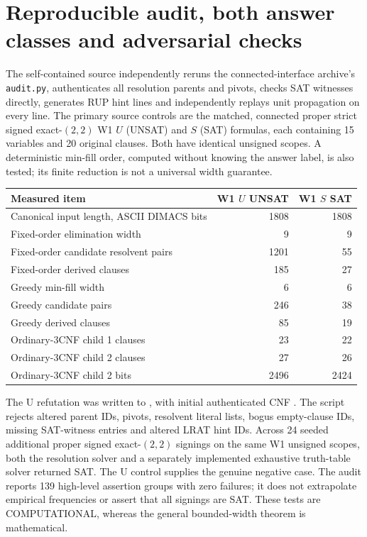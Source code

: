 \documentclass[11pt]{article}
\begin{document}
\section{Reproducible audit, both answer classes and adversarial checks}
The self-contained source  independently reruns the connected-interface archive's \texttt{audit.py}, authenticates all resolution parents and pivots, checks SAT witnesses directly, generates RUP hint lines and independently replays unit propagation on every line. The primary source controls are the matched, connected proper strict signed exact-$(2,2)$ W1 $U$ (UNSAT) and $S$ (SAT) formulas, each containing 15 variables and 20 original clauses. Both have identical unsigned scopes. A deterministic min-fill order, computed without knowing the answer label, is also tested; its finite reduction is not a universal width guarantee.

\begin{center}\begin{tabular}{lrr}\toprule
Measured item & W1 $U$ UNSAT & W1 $S$ SAT\\\midrule
Canonical input length, ASCII DIMACS bits &1808&1808\\
Fixed-order elimination width &9&9\\
Fixed-order candidate resolvent pairs &1201&55\\
Fixed-order derived clauses &185&27\\
Greedy min-fill width &6&6\\
Greedy candidate pairs &246&38\\
Greedy derived clauses &85&19\\
Ordinary-3CNF child 1 clauses &23&22\\
Ordinary-3CNF child 2 clauses &27&26\\
Ordinary-3CNF child 2 bits &2496&2424\\\bottomrule
\end{tabular}\end{center}

The U refutation was written to , with initial authenticated CNF . The script rejects altered parent IDs, pivots, resolvent literal lists, bogus empty-clause IDs, missing SAT-witness entries and altered LRAT hint IDs. Across 24 seeded additional proper signed exact-$(2,2)$ signings on the same W1 unsigned scopes, both the resolution solver and a separately implemented exhaustive truth-table solver returned SAT. The U control supplies the genuine negative case. The audit reports 139 high-level assertion groups with zero failures; it does not extrapolate empirical frequencies or assert that all signings are SAT. These tests are COMPUTATIONAL, whereas the general bounded-width theorem is mathematical.
\end{document}
